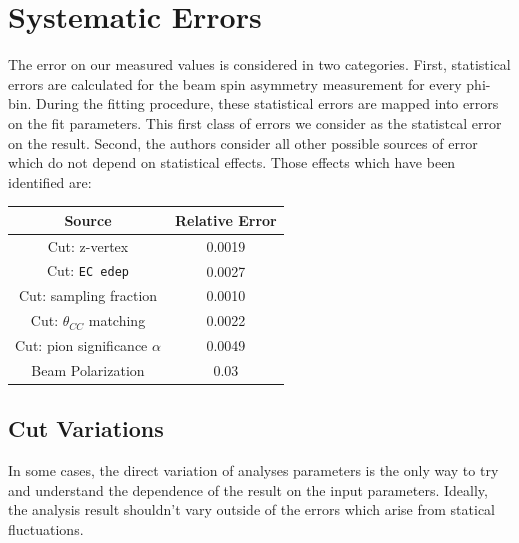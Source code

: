 \section{Systematic Errors}


The error on our measured values is considered in two categories.  First, statistical errors are calculated for the beam spin asymmetry measurement for every phi-bin.  During the fitting procedure, these statistical errors are mapped into errors on the fit parameters.  This first class of errors we consider as the statistcal error on the result.  Second, the authors consider all other possible sources of error which do not depend on statistical effects.  Those effects which have been identified are: \\


\begin{center}
\begin{tabular}{ | c || c |  }
 \hline
 Source & Relative Error\\
 \hline
 Cut: z-vertex                   & 0.0019\\
 Cut: \texttt{EC edep}           & 0.0027\\
 Cut: sampling fraction          & 0.0010\\
 Cut: $\theta_{CC}$ matching     & 0.0022\\
 Cut: pion significance $\alpha$ & 0.0049\\
 Beam Polarization               & 0.03  \\
 \hline
\end{tabular}
\end{center}

\subsection{Cut Variations}
In some cases, the direct variation of analyses parameters is the only way to try and understand the dependence of the result on the input parameters.  Ideally, the analysis result shouldn't vary outside of the errors which arise from statical fluctuations.    

